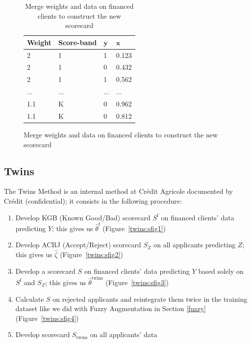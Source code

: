 \begin{table}
{\begin{multicols}{3}
\columnbreak

\begin{subfigure}[t]{0.31\textwidth}
\begin{center}
\begin{adjustbox}{max width=0.95\textwidth}

\begin{tabular}{l l l l}
\toprule
\textbf{Weight} & \textbf{Score-band} & \textbf{${\bm{y}}$} & \textbf{${\bm{x}}$}\\
\midrule
2 & 1 & 1 & 0.123 \\
2 & 1 & 0 & 0.432 \\
2 & 1 & 1 & 0.562 \\
... & ... & ... & ... \\
1.1 & K & 0 & 0.962 \\
1.1 & K & 0 & 0.812 \\
\bottomrule
\end{tabular}
\end{adjustbox}
\end{center}

\caption{Merge weights and data on financed clients to construct the new scorecard}
\label{augment:sfig3}
\end{subfigure}
\end{multicols}
}
\end{table}

\subsection{Twins} \label{Twins}

The Twins Method is an internal method at Crédit Agricole documented by Crédit \cite{groupe} (confidential); it consists in the following procedure:
\begin{enumerate}
\item Develop KGB (Known Good/Bad) scorecard $S^{\text{f}}$ on financed clients' data predicting $Y$; this gives us $\hat{\theta}^{\text{f}}$ (Figure~\ref{twins:sfig1})
\item Develop ACRJ (Accept/Reject) scorecard $S_Z$ on all applicants predicting $Z$; this gives us $\hat{\zeta}$ (Figure~\ref{twins:sfig2})
\item Develop a scorecard $S$ on financed clients' data predicting $Y$ based solely on $S^{\text{f}}$ and $S_Z$; this gives us $\hat{\theta}^{\text{twins}}$ (Figure~\ref{twins:sfig3})
\item Calculate $S$ on rejected applicants and reintegrate them twice in the training dataset like we did with Fuzzy Augmentation in Section \ref{fuzzy} (Figure~\ref{twins:sfig4})
\item Develop scorecard $S_{\text{twins}}$ on all applicants' data
\end{enumerate}

